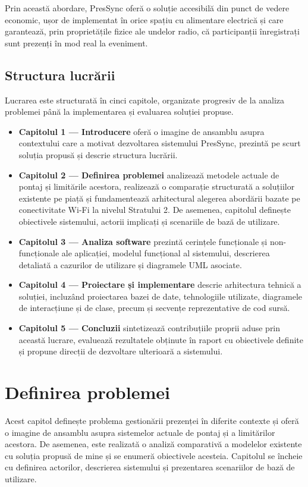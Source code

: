 \documentclass[a4paper,12pt,oneside]{report}
\begin{document}
Prin această abordare, PresSync oferă o soluție accesibilă din punct de vedere economic, ușor de implementat în orice spațiu cu alimentare electrică și care garantează, prin proprietățile fizice ale undelor radio, că participanții înregistrați sunt prezenți în mod real la eveniment.

\section{Structura lucrării}

Lucrarea este structurată în cinci capitole, organizate progresiv de la analiza problemei până la implementarea și evaluarea soluției propuse.

\begin{itemize}
    \item \textbf{Capitolul 1 — Introducere} oferă o imagine de ansamblu asupra contextului care a motivat dezvoltarea sistemului PresSync, prezintă pe scurt soluția propusă și descrie structura lucrării.
    \item \textbf{Capitolul 2 — Definirea problemei} analizează metodele actuale de pontaj și limitările acestora, realizează o comparație structurată a soluțiilor existente pe piață și fundamentează arhitectural alegerea abordării bazate pe conectivitate Wi-Fi la nivelul Stratului 2. De asemenea, capitolul definește obiectivele sistemului, actorii implicați și scenariile de bază de utilizare.
    \item \textbf{Capitolul 3 — Analiza software} prezintă cerințele funcționale și non-funcționale ale aplicației, modelul funcțional al sistemului, descrierea detaliată a cazurilor de utilizare și diagramele UML asociate.
    \item \textbf{Capitolul 4 — Proiectare și implementare} descrie arhitectura tehnică a soluției, incluzând proiectarea bazei de date, tehnologiile utilizate, diagramele de interacțiune și de clase, precum și secvențe reprezentative de cod sursă.
    \item \textbf{Capitolul 5 — Concluzii} sintetizează contribuțiile proprii aduse prin această lucrare, evaluează rezultatele obținute în raport cu obiectivele definite și propune direcții de dezvoltare ulterioară a sistemului.
\end{itemize}
\newpage
\chapter{Definirea problemei}
    Acest capitol definește problema gestionării prezenței în diferite contexte și oferă o imagine de ansamblu asupra sistemelor actuale de pontaj și a limitărilor acestora. De asemenea, este realizată o analiză comparativă a modelelor existente cu soluția propusă de mine și se enumeră obiectivele acesteia. Capitolul se încheie cu definirea actorilor, descrierea sistemului și prezentarea scenariilor de bază de utilizare. 
\end{document}
